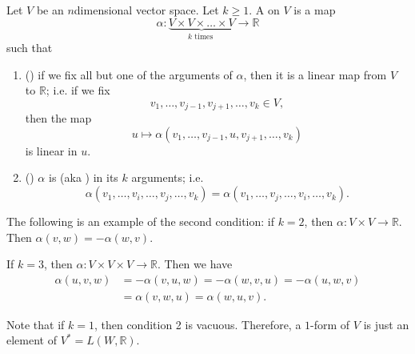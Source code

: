 \documentclass[notoc,notitlepage]{tufte-book}
\begin{document}
\begin{defn}[$k$-Form]\label{defn:_k_form}
  Let $V$ be an $n$dimensional vector space. Let $k \geq 1$. A  on
  $V$ is a map
  \begin{equation*}
    \alpha : \underbrace{V \times V \times \hdots \times V}_{k \text{ times }} \to \mathbb{R}
  \end{equation*}
  such that
  \begin{enumerate}
    \item () if we fix all but one of
      the arguments of $\alpha$, then it is a linear map
      from $V$ to $\mathbb{R}$; i.e. if we fix
      \begin{equation*}
        v_1, \ldots, v_{j - 1}, v_{j + 1}, \ldots, v_k \in V,
      \end{equation*}
      then the map
      \begin{equation*}
        u \mapsto \alpha(v_1, \ldots, v_{j - 1}, u, v_{j + 1}, \ldots, v_k)
      \end{equation*}
       is linear in $u$.

    \item () $\alpha$ is 
      (aka ) in its $k$ arguments; i.e.
      \begin{equation*}
        \alpha ( v_1, \ldots, v_i, \ldots, v_j, \ldots, v_k )
          = \alpha ( v_1, \ldots, v_j, \ldots, v_i, \ldots, v_k ).
      \end{equation*}
  \end{enumerate}
\end{defn}

\begin{eg}
  The following is an example of the second condition: if $k = 2$, then
  $\alpha : V \times V \to \mathbb{R}$. Then $\alpha(v, w) = - \alpha(w, v)$.

  If $k = 3$, then $\alpha : V \times V \times V \to \mathbb{R}$. Then we
  have
  \begin{align*}
    \alpha(u, v, w) &= - \alpha(v, u, w) = - \alpha(w, v, u) = - \alpha(u, w, v) \\
                    &= \alpha(v, w, u) = \alpha(w, u, v).
  \end{align*}
\end{eg}

\begin{note}
  Note that if $k = 1$, then condition 2 is vacuous. Therefore, a $1$-form of
  $V$ is just an element of $V^* = L(W, \mathbb{R})$.
\end{note}
\end{document}
